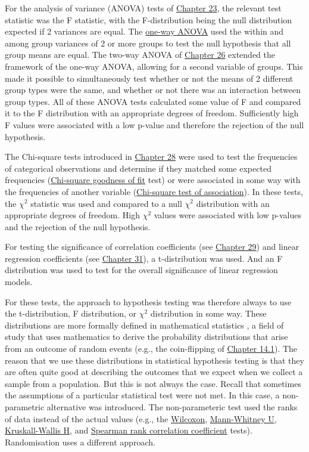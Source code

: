 \documentclass[
]{scrbook}
\begin{document}
For the analysis of variance (ANOVA) tests of \protect\hyperlink{Chapter_23}{Chapter 23}, the relevant test statistic was the F statistic, with the F-distribution being the null distribution expected if 2 variances are equal.
The \protect\hyperlink{one-way-anova}{one-way ANOVA} used the within and among group variances of 2 or more groups to test the null hypothesis that all group means are equal.
The two-way ANOVA of \protect\hyperlink{Chapter_26}{Chapter 26} extended the framework of the one-way ANOVA, allowing for a second variable of groups.
This made it possible to simultaneously test whether or not the means of 2 different group types were the same, and whether or not there was an interaction between group types.
All of these ANOVA tests calculated some value of F and compared it to the F distribution with an appropriate degrees of freedom.
Sufficiently high F values were associated with a low p-value and therefore the rejection of the null hypothesis.

The Chi-square tests introduced in \protect\hyperlink{Chapter_28}{Chapter 28} were used to test the frequencies of categorical observations and determine if they matched some expected frequencies (\protect\hyperlink{chi-squared-goodness-of-fit}{Chi-square goodness of fit} test) or were associated in some way with the frequencies of another variable (\protect\hyperlink{chi-squared-test-of-association}{Chi-square test of association}).
In these tests, the \(\chi^{2}\) statistic was used and compared to a null \(\chi^{2}\) distribution with an appropriate degrees of freedom.
High \(\chi^{2}\) values were associated with low p-values and the rejection of the null hypothesis.

For testing the significance of correlation coefficients (see \protect\hyperlink{Chapter_29}{Chapter 29}) and linear regression coefficients (see \protect\hyperlink{Chapter_31}{Chapter 31}), a t-distribution was used.
And an F distribution was used to test for the overall significance of linear regression models.

For these tests, the approach to hypothesis testing was therefore always to use the t-distribution, F distribution, or \(\chi^{2}\) distribution in some way.
These distributions are more formally defined in mathematical statistics \citep{Miller2004}, a field of study that uses mathematics to derive the probability distributions that arise from an outcome of random events (e.g., the coin-flipping of \protect\hyperlink{an-instructive-example}{Chapter 14.1}).
The reason that we use these distributions in statistical hypothesis testing is that they are often quite good at describing the outcomes that we expect when we collect a sample from a population.
But this is not always the case.
Recall that sometimes the assumptions of a particular statistical test were not met.
In this case, a non-parametric alternative was introduced.
The non-parameteric test used the ranks of data instead of the actual values (e.g., the \protect\hyperlink{wilcoxon-test}{Wilcoxon}, \protect\hyperlink{mann-whitney-u-test}{Mann-Whitney U}, \protect\hyperlink{Chapter_25}{Kruskall-Wallis H}, and \protect\hyperlink{spearman-rank-correlation-coefficient}{Spearman rank correlation coefficient} tests).
Randomisation uses a different approach.
\end{document}
